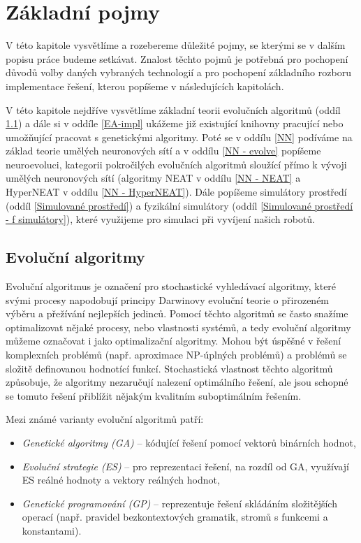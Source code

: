 \chapter{Základní pojmy}

V této kapitole vysvětlíme a rozebereme důležité pojmy, se kterými se v dalším
popisu práce budeme setkávat. Znalost těchto pojmů je potřebná pro pochopení
důvodů volby daných vybraných technologií a pro pochopení základního rozboru
implementace řešení, kterou popíšeme v následujících kapitolách.

V této kapitole nejdříve vysvětlíme základní teorii evolučních algoritmů (oddíl
\ref{Evoluční algoritmy}) a dále si v oddíle \ref{EA-impl} ukážeme již
existující knihovny pracující nebo umožňující pracovat s genetickými algoritmy.
Poté se v oddílu \ref{NN} podíváme na základ teorie umělých neuronových sítí a
v oddílu \ref{NN - evolve} popíšeme neuroevoluci, kategorii pokročilých
evolučních algoritmů sloužící přímo k vývoji umělých neuronových sítí
(algoritmy NEAT v oddílu \ref{NN - NEAT} a HyperNEAT v oddílu \ref{NN -
HyperNEAT}). Dále popíšeme simulátory prostředí (oddíl \ref{Simulované
prostředí}) a fyzikální simulátory (oddíl \ref{Simulované prostředí - f
simulátory}), které využijeme pro simulaci při vyvíjení našich robotů.

\section{Evoluční algoritmy} \label{Evoluční algoritmy}

Evoluční algoritmus je označení pro stochastické vyhledávací algoritmy, které
svými procesy napodobují principy Darwinovy evoluční teorie o přirozeném výběru
a přežívání nejlepších jedinců. Pomocí těchto algoritmů se často snažíme
optimalizovat nějaké procesy, nebo vlastnosti systémů, a tedy evoluční
algoritmy můžeme označovat i jako optimalizační algoritmy. Mohou být úspěšné v
řešení komplexních problémů (např. aproximace NP-úplných problémů) a problémů
se složitě definovanou hodnotící funkcí. Stochastická vlastnost těchto
algoritmů způsobuje, že algoritmy nezaručují nalezení optimálního řešení, ale
jsou schopné se tomuto řešení přiblížit nějakým kvalitním suboptimálním
řešením.

Mezi známé varianty evoluční algoritmů patří:
\begin{itemize}
    \item \emph{Genetické algoritmy (GA)} -- kódující řešení pomocí vektorů binárních
        hodnot,
    \item \emph{Evoluční strategie (ES)} -- pro reprezentaci řešení, na rozdíl
        od GA, využívají ES reálné hodnoty a vektory reálných hodnot, 
    \item \emph{Genetické programování (GP)} -- reprezentuje řešení skládáním
        složitějších operací (např. pravidel bezkontextových gramatik, stromů s
        funkcemi a konstantami).
\end{itemize}

